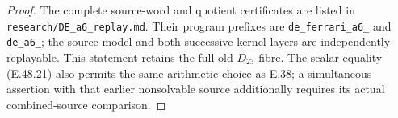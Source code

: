 \begin{proof}
The complete source-word and quotient certificates are
listed in \texttt{research/DE\_a6\_replay.md}.
Their program prefixes are \texttt{de\_ferrari\_a6\_}
and \texttt{de\_a6\_}; the source model and both successive
kernel layers are independently replayable.
This statement retains the full old $D_{23}$ fibre.
The scalar equality \textup{(E.48.21)} also permits the
same arithmetic choice as E.38; a simultaneous assertion
with that earlier nonsolvable source additionally requires
its actual combined-source comparison.
\end{proof}
